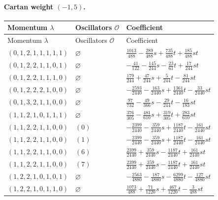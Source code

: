 \paragraph{Cartan weight $(-1,5)$.}

\begingroup\scriptsize
\setlength{\tabcolsep}{5pt}
\begin{longtable}{@{}lll@{}}
\toprule
Momentum $\lambda$ & Oscillators $\mathcal O$ & Coefficient\\
\midrule\endfirsthead
\toprule
Momentum $\lambda$ & Oscillators $\mathcal O$ & Coefficient\\
\midrule\endhead
\bottomrule\endfoot
$(0,1,2,1,1,1,1,1)$ & $\varnothing$ & $\frac{1013}{488}-\frac{289}{488}s+\allowbreak \frac{735}{488}t+\allowbreak \frac{185}{488}st$\\
$(0,1,2,2,1,1,0,1)$ & $\varnothing$ & $-\frac{41}{122}-\frac{145}{244}s-\frac{23}{61}t+\allowbreak \frac{17}{244}st$\\
$(0,1,2,2,1,1,1,0)$ & $\varnothing$ & $\frac{179}{244}+\allowbreak \frac{47}{244}s+\allowbreak \frac{5}{244}t-\frac{81}{244}st$\\
$(0,1,2,2,2,1,0,0)$ & $\varnothing$ & $-\frac{2593}{2440}-\frac{163}{2440}s+\allowbreak \frac{1361}{2440}t-\frac{33}{2440}st$\\
$(0,1,3,2,1,1,0,0)$ & $\varnothing$ & $\frac{97}{732}-\frac{49}{366}s-\frac{29}{244}t-\frac{16}{183}st$\\
$(1,1,2,1,0,1,1,1)$ & $\varnothing$ & $\frac{376}{305}-\frac{481}{610}s+\allowbreak \frac{319}{305}t+\allowbreak \frac{283}{610}st$\\
$(1,1,2,2,1,1,0,0)$ & $(0)$ & $-\frac{2399}{2440}-\frac{359}{2440}s+\allowbreak \frac{1187}{2440}t-\frac{161}{2440}st$\\
$(1,1,2,2,1,1,0,0)$ & $(1)$ & $-\frac{2399}{2440}-\frac{359}{2440}s+\allowbreak \frac{1187}{2440}t-\frac{161}{2440}st$\\
$(1,1,2,2,1,1,0,0)$ & $(6)$ & $\frac{2399}{2440}+\allowbreak \frac{359}{2440}s-\frac{1187}{2440}t+\allowbreak \frac{161}{2440}st$\\
$(1,1,2,2,1,1,0,0)$ & $(7)$ & $\frac{2399}{2440}+\allowbreak \frac{359}{2440}s-\frac{1187}{2440}t+\allowbreak \frac{161}{2440}st$\\
$(1,2,2,1,0,1,0,1)$ & $\varnothing$ & $-\frac{2563}{4880}-\frac{187}{4880}s-\frac{6299}{4880}t-\frac{127}{4880}st$\\
$(1,2,2,1,0,1,1,0)$ & $\varnothing$ & $\frac{1073}{488}+\allowbreak \frac{71}{1220}s+\allowbreak \frac{467}{1220}t-\frac{3}{488}st$\\

\end{longtable}
